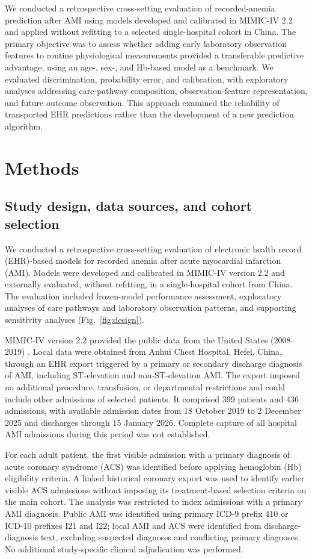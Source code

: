 \documentclass[pdflatex,sn-mathphys-num]{sn-jnl}%
\theoremstyle{thmstyleone}%
\theoremstyle{thmstyletwo}%
\theoremstyle{thmstylethree}%
\begin{document}
We conducted a retrospective cross-setting evaluation of recorded-anemia prediction after AMI using models developed and calibrated in MIMIC-IV 2.2 and applied without refitting to a selected single-hospital cohort in China. The primary objective was to assess whether adding early laboratory observation features to routine physiological measurements provided a transferable predictive advantage, using an age-, sex-, and Hb-based model as a benchmark. We evaluated discrimination, probability error, and calibration, with exploratory analyses addressing care-pathway composition, observation-feature representation, and future outcome observation. This approach examined the reliability of transported EHR predictions rather than the development of a new prediction algorithm.

\section{Methods}

\subsection{Study design, data sources, and cohort selection}

We conducted a retrospective cross-setting evaluation of electronic health record (EHR)-based models for recorded anemia after acute myocardial infarction (AMI). Models were developed and calibrated in MIMIC-IV version 2.2 and externally evaluated, without refitting, in a single-hospital cohort from China. The evaluation included frozen-model performance assessment, exploratory analyses of care pathways and laboratory observation patterns, and supporting sensitivity analyses (Fig.~\ref{fig:design}).

MIMIC-IV version 2.2 provided the public data from the United States (2008--2019) \cite{mimicpaper,mimicdata}. Local data were obtained from Anhui Chest Hospital, Hefei, China, through an EHR export triggered by a primary or secondary discharge diagnosis of AMI, including ST-elevation and non-ST-elevation AMI. The export imposed no additional procedure, transfusion, or departmental restrictions and could include other admissions of selected patients. It comprised 399 patients and 436 admissions, with available admission dates from 18 October 2019 to 2 December 2025 and discharges through 15 January 2026. Complete capture of all hospital AMI admissions during this period was not established.

For each adult patient, the first visible admission with a primary diagnosis of acute coronary syndrome (ACS) was identified before applying hemoglobin (Hb) eligibility criteria. A linked historical coronary export was used to identify earlier visible ACS admissions without imposing its treatment-based selection criteria on the main cohort. The analysis was restricted to index admissions with a primary AMI diagnosis. Public AMI was identified using primary ICD-9 prefix 410 or ICD-10 prefixes I21 and I22; local AMI and ACS were identified from discharge-diagnosis text, excluding suspected diagnoses and conflicting primary diagnoses. No additional study-specific clinical adjudication was performed.
\end{document}
